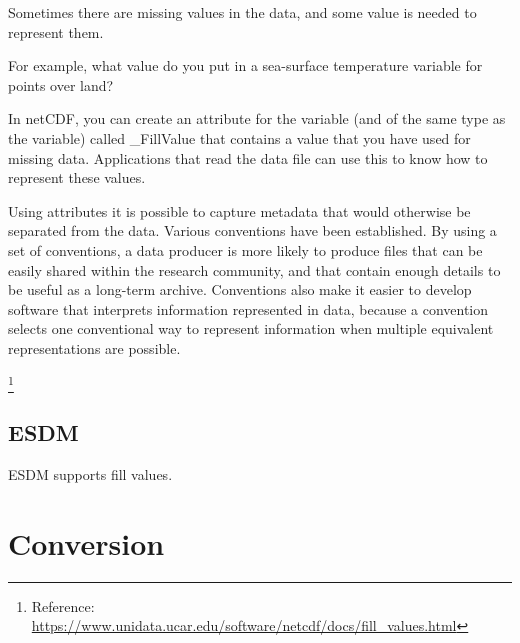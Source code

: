 \tab
\begin{framed}

Sometimes there are missing values in the data, and some value is needed to represent them.

For example, what value do you put in a sea-surface temperature variable for points over land?

In netCDF, you can create an attribute for the variable (and of the same type as the variable) called \_FillValue that contains a value that you have used for missing data. Applications that read the data file can use this to know how to represent these values.

Using attributes it is possible to capture metadata that would otherwise be separated from the data. Various conventions have been established. By using a set of conventions, a data producer is more likely to produce files that can be easily shared within the research community, and that contain enough details to be useful as a long-term archive. Conventions also make it easier to develop software that interprets information represented in data, because a convention selects one conventional way to represent information when multiple equivalent representations are possible.

\footnote{Reference: \url{https://www.unidata.ucar.edu/software/netcdf/docs/fill_values.html}}

\end{framed}

\subsection{ESDM}

\tab
ESDM supports fill values.

\section{Conversion}

